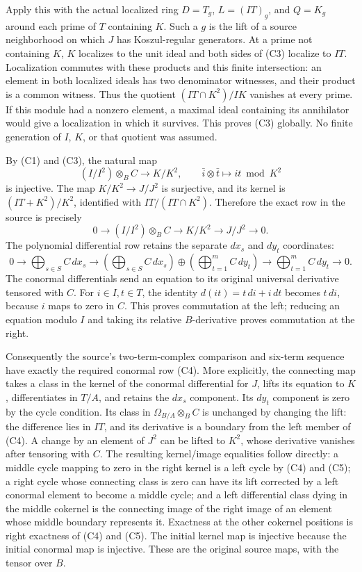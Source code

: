 \documentclass[11pt]{article}
\begin{document}
Apply this with the actual localized ring \(D=T_g\), \(L=(IT)_g\), and \(Q=K_g\) around each prime of \(T\) containing \(K\). Such a \(g\) is the lift of a source neighborhood on which \(J\) has Koszul-regular generators. At a prime not containing \(K\), \(K\) localizes to the unit ideal and both sides of (C3) localize to \(IT\). Localization commutes with these products and this finite intersection: an element in both localized ideals has two denominator witnesses, and their product is a common witness. Thus the quotient \((IT\cap K^2)/IK\) vanishes at every prime. If this module had a nonzero element, a maximal ideal containing its annihilator would give a localization in which it survives. This proves (C3) globally. No finite generation of \(I\), \(K\), or that quotient was assumed.

By (C1) and (C3), the natural map \[
 (I/I^2)\otimes_B C\longrightarrow K/K^2,\qquad
 \bar i\otimes\bar t\longmapsto it\bmod K^2
\] is injective. The map \(K/K^2\to J/J^2\) is surjective, and its kernel is \((IT+K^2)/K^2\), identified with \(IT/(IT\cap K^2)\). Therefore the exact row in the source is precisely \[
 0\longrightarrow (I/I^2)\otimes_B C
 \longrightarrow K/K^2\longrightarrow J/J^2\longrightarrow0.
\tag{C4}
\] The polynomial differential row retains the separate \(dx_s\) and \(dy_t\) coordinates: \[
 0\longrightarrow
 \bigoplus_{s\in S}C\,dx_s
 \longrightarrow
 \left(\bigoplus_{s\in S}C\,dx_s\right)\oplus
 \left(\bigoplus_{t=1}^{m}C\,dy_t\right)
 \longrightarrow
 \bigoplus_{t=1}^{m}C\,dy_t
 \longrightarrow0.
\tag{C5}
\] The conormal differentials send an equation to its original universal derivative tensored with \(C\). For \(i\in I,t\in T\), the identity \(d(it)=t\,di+i\,dt\) becomes \(t\,di\), because \(i\) maps to zero in \(C\). This proves commutation at the left; reducing an equation modulo \(I\) and taking its relative \(B\)-derivative proves commutation at the right.

Consequently the source's two-term-complex comparison and six-term sequence have exactly the required conormal row (C4). More explicitly, the connecting map takes a class in the kernel of the conormal differential for \(J\), lifts its equation to \(K\), differentiates in \(T/A\), and retains the \(dx_s\) component. Its \(dy_t\) component is zero by the cycle condition. Its class in \(\Omega_{B/A}\otimes_B C\) is unchanged by changing the lift: the difference lies in \(IT\), and its derivative is a boundary from the left member of (C4). A change by an element of \(J^2\) can be lifted to \(K^2\), whose derivative vanishes after tensoring with \(C\). The resulting kernel/image equalities follow directly: a middle cycle mapping to zero in the right kernel is a left cycle by (C4) and (C5); a right cycle whose connecting class is zero can have its lift corrected by a left conormal element to become a middle cycle; and a left differential class dying in the middle cokernel is the connecting image of the right image of an element whose middle boundary represents it. Exactness at the other cokernel positions is right exactness of (C4) and (C5). The initial kernel map is injective because the initial conormal map is injective. These are the original source maps, with the tensor over \(B\).
\end{document}
